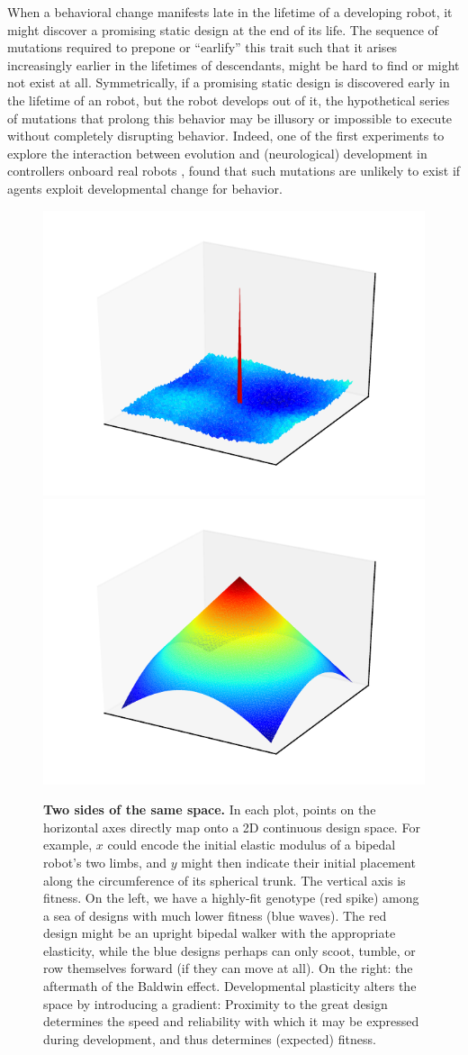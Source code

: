 When a behavioral change manifests late in the lifetime of a developing robot, it might discover a promising static design at the end of its life.
The sequence of mutations required to prepone or ``earlify'' this trait such that it arises increasingly earlier in the lifetimes of descendants, might be hard to find or might not exist at all.
Symmetrically, if a promising static design is discovered early in the lifetime of an robot, but the robot develops out of it, the hypothetical series of mutations that prolong this behavior may be 
illusory or impossible to execute without completely disrupting behavior.
Indeed, one of the first experiments to explore the interaction between evolution and (neurological) development in controllers onboard real robots \cite{floreano1996plastic}, found that such mutations are unlikely to exist if agents exploit developmental change for behavior.

\begin{figure}
\centering
\includegraphics[trim={40pt 20pt 30pt 25pt},clip,width=0.49\linewidth]{fig/baldwin_rugged.pdf}
\includegraphics[trim={40pt 20pt 30pt 25pt},clip,width=0.49\linewidth]{fig/baldwin_smooth.pdf}
\caption{\label{fig:baldwin3d}\textbf{Two sides of the same space.} 
In each plot, points on the horizontal axes directly map onto a 2D continuous design space.
For example, $x$ could encode the initial elastic modulus of a bipedal robot's two limbs, and $y$ might then indicate their initial placement along the circumference of its spherical trunk.
The vertical axis is fitness.
On the left, we have a highly-fit genotype (red spike) among a sea of designs with much lower fitness (blue waves).
The red design might be an upright bipedal walker with the appropriate elasticity,
while the blue designs perhaps can only scoot, tumble, or row themselves forward (if they can move at all).
On the right: the aftermath of the Baldwin effect.
Developmental plasticity alters the space by introducing a gradient: 
Proximity to the great design determines the speed and reliability with which it may be expressed during development, and thus determines (expected) fitness.
}
\end{figure}


